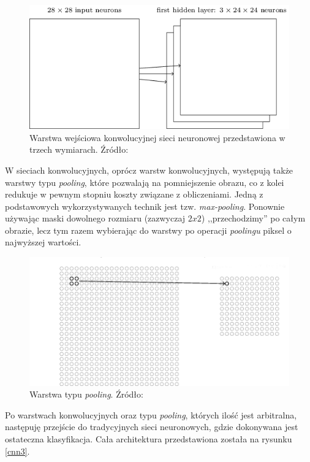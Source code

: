 \begin{figure}[ht!]
\centering
\includegraphics[scale=0.6]{res/cnn2.png}
\caption[Caption for LOF]{Warstwa wejściowa konwolucyjnej sieci neuronowej przedstawiona w trzech wymiarach. Źródło:\cite{nielsen}\label{cnn2}} 
\end{figure}

W sieciach konwolucyjnych, oprócz warstw konwolucyjnych, występują także warstwy typu \textit{pooling}, które pozwalają na pomniejszenie obrazu, co z kolei redukuje w pewnym stopniu koszty związane z obliczeniami. Jedną z podstawowych wykorzystywanych technik jest tzw. \textit{max-pooling}. Ponownie używając maski dowolnego rozmiaru (zazwyczaj $2x2$) ,,przechodzimy'' po całym obrazie, lecz tym razem wybierając do warstwy po operacji \textit{poolingu} piksel o najwyższej wartości.

\begin{figure}[ht!]
\centering
\includegraphics[scale=0.6]{res/pooling.png}
\caption[Caption for LOF]{Warstwa typu \textit{pooling}. Źródło:\cite{nielsen}\label{pooling}} 
\end{figure}

Po warstwach konwolucyjnych oraz typu \textit{pooling}, których ilość jest arbitralna, następuję przejście do tradycyjnych sieci neuronowych, gdzie dokonywana jest ostateczna klasyfikacja. Cała architektura przedstawiona została na rysunku \ref{cnn3}.

